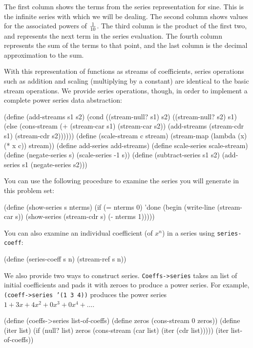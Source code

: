 The first column shows the terms from the series representation for
sine.  This is the infinite series with which we will be dealing.  The
second column shows values for the associated powers of ${1 \over 10}$.
The third column is the product of the first two, and represents the
next term in the series evaluation.  The fourth column represents the
sum of the terms to that point, and the last column is the decimal
approximation to the sum.

With this representation of functions as streams of coefficients,
series operations such as addition and scaling (multiplying by a
constant) are identical to the basic stream operations.  We provide
series operations, though, in order to implement a complete power
series data abstraction:

\beginlisp
(define (add-streams s1 s2)
  (cond ((stream-null? s1) s2)
        ((stream-null? s2) s1)
        (else
         (cons-stream (+ (stream-car s1) (stream-car s2))
                      (add-streams (stream-cdr s1)
                                   (stream-cdr s2))))))
\null
(define (scale-stream c stream)
  (stream-map (lambda (x) (* x c)) stream))
\null
(define add-series add-streams)
\null
(define scale-series scale-stream)
\null
(define (negate-series s)
  (scale-series -1 s))
\null
(define (subtract-series s1 s2)
  (add-series s1 (negate-series s2)))
\endlisp

\noindent You can use the following procedure to examine the series you will
generate in this problem set:

\beginlisp
(define (show-series s nterms)
  (if (= nterms 0)
      'done
      (begin (write-line (stream-car s))
             (show-series (stream-cdr s) (- nterms 1)))))
\endlisp

\noindent
You can also examine an individual coefficient (of $x^n$) in a series
using {\tt series-coeff}:

\beginlisp
(define (series-coeff s n)
  (stream-ref s n))
\endlisp

We also provide two ways to construct series.  {\tt Coeffs->series}
takes an list of initial coefficients and pads it with zeroes to
produce a power series.  For example, {\tt (coeff->series '(1 3 4))}
produces the power series $1+3x+4x^2+0x^3+0x^4+\ldots{}$.

\beginlisp
(define (coeffs->series list-of-coeffs)
  (define zeros (cons-stream 0 zeros))
  (define (iter list)
    (if (null? list)
        zeros
        (cons-stream (car list)
                     (iter (cdr list)))))
  (iter list-of-coeffs))
\endlisp

